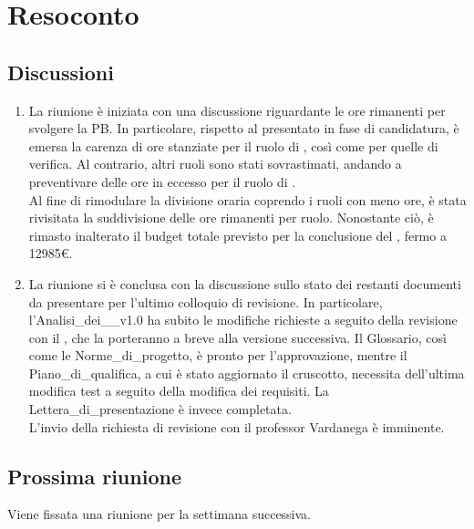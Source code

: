 \section{Resoconto} \label{sec:resoconto}
\subsection{Discussioni} \label{subsec:resdiscussione}
\begin{enumerate}
    \item La riunione è iniziata con una discussione riguardante le ore rimanenti per svolgere la PB. In particolare, rispetto al  presentato in fase di candidatura, è emersa la carenza di ore stanziate per il ruolo di , così come per quelle di verifica. Al contrario, altri ruoli sono stati sovrastimati, andando a preventivare delle ore in eccesso per il ruolo di .\\
    Al fine di rimodulare la divisione oraria coprendo i ruoli con meno ore, è stata rivisitata la suddivisione delle ore rimanenti per ruolo. Nonostante ciò, è rimasto inalterato il budget totale previsto per la conclusione del , fermo a 12985€.

    \item La riunione si è conclusa con la discussione sullo stato dei restanti documenti da presentare per l'ultimo colloquio di revisione. In particolare, l'Analisi\_dei\_\_v1.0 ha subito le modifiche richieste a seguito della revisione con il , che la porteranno a breve alla versione successiva. Il Glossario, così come le Norme\_di\_progetto, è pronto per l'approvazione, mentre il Piano\_di\_qualifica, a cui è stato aggiornato il cruscotto, necessita dell'ultima modifica  test a seguito della modifica dei requisiti. La Lettera\_di\_presentazione è invece completata.\\
    L'invio della richiesta di revisione con il professor Vardanega è imminente.
    
\end{enumerate}

\subsection{Prossima riunione} \label{subsec:riunione}
Viene fissata una riunione per la settimana successiva.